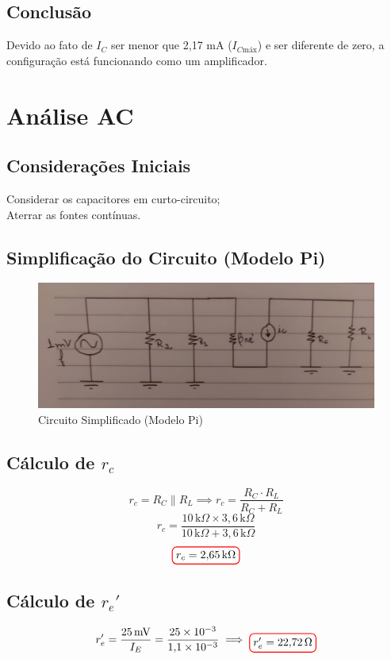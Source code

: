 \documentclass[12pt,openany,oneside,a4paper]{abntex2}
\begin{document}
\section{Conclusão}
Devido ao fato de $I_{C}$ ser menor que 2{,}17 mA ($I_{C\text{máx}}$) e ser diferente de zero, a configuração está funcionando como um amplificador.

\chapter{Análise AC}
\section{Considerações Iniciais}
Considerar os capacitores em curto-circuito; \\
Aterrar as fontes contínuas.

\section{Simplificação do Circuito (Modelo Pi)}
\begin{figure}[h]
  \centering
  \includegraphics[width=\linewidth]{f3.jpeg}
  \caption{Circuito Simplificado (Modelo Pi)}
  \label{fig:exemplo}
\end{figure}

\section{Cálculo de $r_c$}
\[
r_c = {R_C \parallel R_L} \implies r_c = \frac{R_C \cdot R_L}{R_C + R_L}
\]
\[
r_c = \frac{10 \, \text{k}\Omega \times 3{,}6 \, \text{k}\Omega}{10 \, \text{k}\Omega + 3{,}6 \, \text{k}\Omega}
\]
\[
\tikz[baseline]{\node[draw=red, thick, rounded corners] {$r_c = 2{,}65 \, \text{k}\Omega$};}
\]

\section{Cálculo de $r_e'$}
\[
r_e^{\prime} = \frac{25 \, \text{mV}}{I_E} = \frac{25 \times 10^{-3}}{1{,}1 \times 10^{-3}} \implies \tikz[baseline]{\node[draw=red, thick, rounded corners] {$r_e^{\prime} = 22{,}72 \, \Omega$};}
\]
\end{document}
